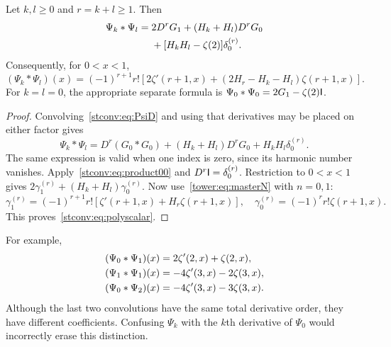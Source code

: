 \begin{theorem}\label{stconv:thm:polygamma}
Let $k,l\ge0$ and $r=k+l\ge1$. Then
\begin{align}
 \Psi_k*\Psi_l={}&2D^rG_1+(H_k+H_l)D^rG_0\label{stconv:eq:polyfull}\\
 &+[H_kH_l-\zeta(2)]\delta_0^{(r)}.\notag
\end{align}
Consequently, for $0<x<1$,
\begin{equation}\label{stconv:eq:polyscalar}
 (\Psi_k*\Psi_l)(x)=(-1)^{r+1}r!
 \left[2\zeta'(r+1,x)+(2H_r-H_k-H_l)\zeta(r+1,x)\right].
\end{equation}
For $k=l=0$, the appropriate separate formula is
$\Psi_0*\Psi_0=2G_1-\zeta(2)\mathsf I$.
\end{theorem}
\begin{proof}
Convolving~\eqref{stconv:eq:PsiD} and using that derivatives may be placed on
either factor gives
\[
 \Psi_k*\Psi_l=D^r(G_0*G_0)
 +(H_k+H_l)D^rG_0+H_kH_l\delta_0^{(r)}.
\]
The same expression is valid when one index is zero, since its harmonic
number vanishes. Apply~\eqref{stconv:eq:product00} and
$D^r\mathsf I=\delta_0^{(r)}$. Restriction to $0<x<1$ gives
$2\gamma_1^{(r)}+(H_k+H_l)\gamma_0^{(r)}$.
Now use~\eqref{tower:eq:masterN} with $n=0,1$:
\[
 \gamma_1^{(r)}=(-1)^{r+1}r![\zeta'(r+1,x)+H_r\zeta(r+1,x)],
 \quad \gamma_0^{(r)}=(-1)^rr!\zeta(r+1,x).
\]
This proves~\eqref{stconv:eq:polyscalar}.
\end{proof}

For example,
\begin{align}
 (\Psi_0*\Psi_1)(x)&=2\zeta'(2,x)+\zeta(2,x),\label{stconv:eq:polyexamples}\\
 (\Psi_1*\Psi_1)(x)&=-4\zeta'(3,x)-2\zeta(3,x),\notag\\
 (\Psi_0*\Psi_2)(x)&=-4\zeta'(3,x)-3\zeta(3,x).\notag
\end{align}
Although the last two convolutions have the same total derivative order,
they have different coefficients. Confusing $\Psi_k$ with the $k$th
derivative of $\Psi_0$ would incorrectly erase this distinction.

